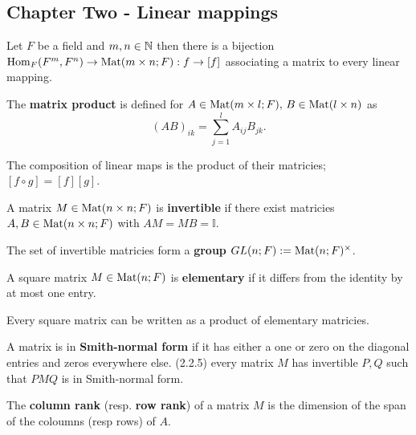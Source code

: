 \noindent\dotfill
\begin{multicols}{2}

\section*{Chapter Two - Linear mappings}
\begin{theorem}[2.1.1]
Let $F$ be a field and $m,n\in\mathbb{N}$ then there is a bijection $\mathrm{Hom}_F(F^m,F^n) \to \mathrm{Mat}(m\times n;F):f\to[f]$ associating a matrix to every linear mapping.
\end{theorem}

\begin{definition}
The \textbf{matrix product} is defined for $A\in\mathrm{Mat}(m\times l;F),\,B\in\mathrm{Mat}(l\times n)$ as
    \[
    (AB)_{ik} = \sum_{j=1}^l A_{ij}B_{jk}.
    \]
\end{definition}

\begin{theorem}
The composition of linear maps is the product of their matricies; $[f\circ g]=[f][g]$. 
\end{theorem}

\begin{definition}
A matrix $M\in\mathrm{Mat}(n\times n;F)$ is \textbf{invertible} if there exist  matricies $A,B\in\mathrm{Mat}(n\times n;F)$ with $AM=MB=\mathbb{I}$.
\end{definition}

\begin{theorem}
The set of invertible matricies form a \textbf{group} $GL(n;F):=\mathrm{Mat}(n;F)^\times$.
\end{theorem}

\begin{definition}
A square matrix $M\in\mathrm{Mat}(n;F)$ is \textbf{elementary} if it differs from the identity by at most one entry.
\end{definition}

\begin{theorem}[2.2.3]
Every square matrix can be written as a product of elementary matricies.
\end{theorem}

\begin{definition}
A matrix is in \textbf{Smith-normal form} if it has either a one or zero on the diagonal entries and zeros everywhere else. (2.2.5) every matrix $M$ has invertible $P,Q$ such that $PMQ$ is in Smith-normal form.
\end{definition}

\begin{definition}
The \textbf{column rank} (resp. \textbf{row rank}) of a matrix $M$ is the dimension of the span of the coloumns (resp rows) of $A$.
\end{definition}


\end{multicols}
